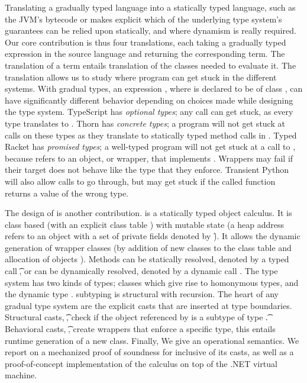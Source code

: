 \documentclass[acmsmall, anonymous, authordraft, review]{acmart} %
\begin{document}
Translating a gradually typed language into a statically typed language,
such as the JVM's bytecode or \kafka makes explicit which of the underlying
type system's guarantees can be relied upon statically, and where dynamism
is really required.  Our core contribution is thus four translations, each
taking a gradually typed expression \HT\e\T in the source language and
returning the corresponding \kafka term. The translation of a term entails
translation of the classes needed to evaluate it.  The translation allows us
to study where program can get stuck in the different systems.  With gradual
types, an expression \Call\x\m\e, where \x is declared to be of class \C,
can have significantly different behavior depending on choices made while
designing the type system. TypeScript has \emph{optional types}; any call
can get stuck, as every type translates to \any. Thorn has \emph{concrete
  types}; a program will not get stuck at calls on these types as they
translate to statically typed method calls in \kafka. Typed Racket has
\emph{promised types}; a well-typed program will not get stuck at a call to
\m, because \x refers to an object, or wrapper, that implements \m. Wrappers
may fail if their target does not behave like the type that they
enforce. Transient Python will also allow calls to go through, but may get
stuck if the called function returns a value of the wrong type.

The design of \kafka is another contribution.  \kafka is a statically typed
object calculus.  It is class based (with an explicit class table \K) with
mutable state (a heap address \a refers to an object with a set of private
fields denoted by \f). It allows the dynamic generation of wrapper classes
(by addition of new classes to the class table \K and allocation of objects
\a).  Methods can be statically resolved, denoted by a typed call
\KCall\a\m\x\t\tp, or can be dynamically resolved, denoted by a dynamic call
\DynCall\a\m\x. The \kafka type system has two kinds of types; classes which
give rise to homonymous types, and the dynamic type \any.  \kafka subtyping
is structural with recursion.  The heart of any gradual type system are the
explicit casts that are inserted at type boundaries.  Structural casts,
\SubCast\t\a, check if the object referenced by \a is a subtype of type \t.
Behavioral casts, \BehCast\t\a, create wrappers that enforce a specific
type, this entails runtime generation of a new class. Finally, We give
\kafka an operational semantics. We report on a mechanized proof of
soundness for \kafka inclusive of its casts, as well as a proof-of-concept
implementation of the calculus on top of the .NET virtual machine.
\end{document}
